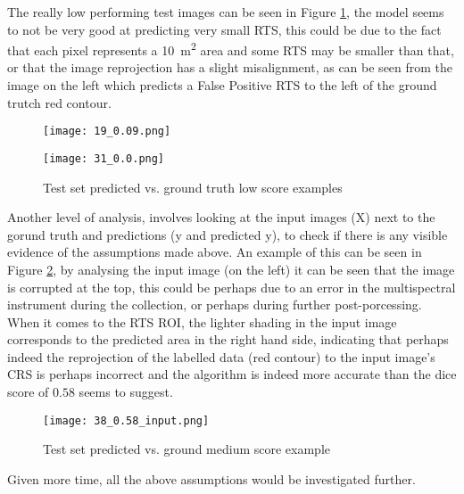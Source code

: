  The really low performing test images can be seen in Figure \ref{low_score_pic}, the model seems to not be very good at predicting very small \gls{RTS}, this could be due to the fact that each pixel represents a \SI{10}{\metre\squared} area and some \gls{RTS} may be smaller than that, or that the image reprojection has a slight misalignment, as can be seen from the image on the left which predicts a False Positive \gls{RTS} to the left of the ground trutch red contour.

    \begin{figure}[hbt!]
        \begin{minipage}[c]{0.55\linewidth}
        \texttt{[image: 19\_0.09.png]}
        \label{best_dice}
        \end{minipage}
            \hfill
            \begin{minipage}[c]{0.55\linewidth}
            \texttt{[image: 31\_0.0.png]}
            \label{low_score_pic}
        \end{minipage}
        \caption{Test set predicted vs. ground truth low score examples}
    \end{figure}

Another level of analysis, involves looking at the input images (X) next to the gorund truth and predictions (y and predicted y), to check if there is any visible evidence of the assumptions made above. An example of this can be seen in Figure \ref{medium_score_input_pic}, by analysing the input image (on the left) it can be seen that the image is corrupted at the top, this could be perhaps due to an error in the multispectral instrument during the collection, or perhaps during further post-porcessing. When it comes to the \gls{RTS} \gls{ROI}, the lighter shading in the input image corresponds to the predicted area in the right hand side, indicating that perhaps indeed the reprojection of the labelled data (red contour) to the input image's \gls{CRS} is perhaps incorrect and the algorithm is indeed more accurate than the dice score of $0.58$ seems to suggest.
    \begin{figure}[hbt!]
        \centering
        \texttt{[image: 38\_0.58\_input.png]}
        \caption{Test set predicted vs. ground medium score example}
        \label{medium_score_input_pic}
    \end{figure}

Given more time, all the above assumptions would be investigated further.